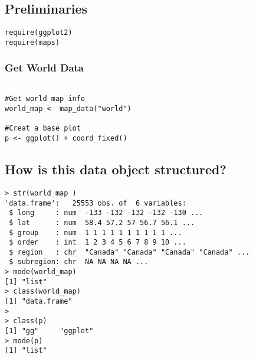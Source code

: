 \subsection*{Preliminaries}
\begin{framed}
\begin{verbatim}
require(ggplot2)
require(maps)
\end{verbatim}
\end{framed}
\subsubsection*{Get World Data}
\begin{framed}
\begin{verbatim}

#Get world map info
world_map <- map_data("world")

#Creat a base plot
p <- ggplot() + coord_fixed()

\end{verbatim}
\end{framed}
\subsection*{How is this data object structured?}
\begin{framed}
\begin{verbatim}
> str(world_map )
'data.frame':   25553 obs. of  6 variables:
 $ long     : num  -133 -132 -132 -132 -130 ...
 $ lat      : num  58.4 57.2 57 56.7 56.1 ...
 $ group    : num  1 1 1 1 1 1 1 1 1 1 ...
 $ order    : int  1 2 3 4 5 6 7 8 9 10 ...
 $ region   : chr  "Canada" "Canada" "Canada" "Canada" ...
 $ subregion: chr  NA NA NA NA ...
> mode(world_map)
[1] "list"
> class(world_map)
[1] "data.frame"
>
> class(p)
[1] "gg"     "ggplot"
> mode(p)
[1] "list"
\end{verbatim}
\end{framed}
